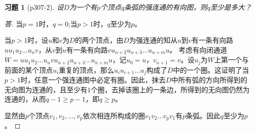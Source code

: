 \documentclass{article}
\begin{document}
\begin{CJK}{UTF8}{gbsn}
  \newtheorem*{Exercise}{习题}
\begin{Exercise}[p307-2]
  设$D$为一个有$p$个顶点$q$条弧的强连通的有向图，则$q$至少是多大？
\end{Exercise}
\begin{proof}[答]
  当$p=1$时，$q=0$;当$p>1$时，$q$至少为$p$。

  当$p>1$时，设$u$和$v$为$D$的两个顶点，由$D$为强连通的知从$u$到$v$有一条有向路$uu_1u_2\ldots u_nv$，从$v$到$u$有一条有向路$vu_{n+2}u_{n+3}\ldots u_{n+m}u$。
  考虑有向闭通道$W=uu_1u_2\ldots u_nvu_{n+2}u_{n+3}\ldots u_{n+m}u$，记$u_0=u$，$v_{n+1}=v$。设$u_j$为$W$上第一个与前面的某个顶点$u_i$重复的顶点，那么$u_iu_{i+1}\ldots u_j$构成了$D$中的一个圈。这证明了当$p>1$时，任意一个强连通图中必定有圈。因此，抹去$D$中所有弧的方向所得到的无向图为连通的，且至少有$1$个圈，去掉该圈上的一条边，所得到的无向图仍然为连通的，从而$q-1\geq p-1$，即$q\geq p$。

  显然由$p$个顶点$v_1,v_2,\ldots,v_p$依次相连所构成的圈$v_1v_2\ldots v_pv_1$有$p$条弧。因此$q$至少为$p$。
 
\end{proof}

\end{CJK}
\end{document}
